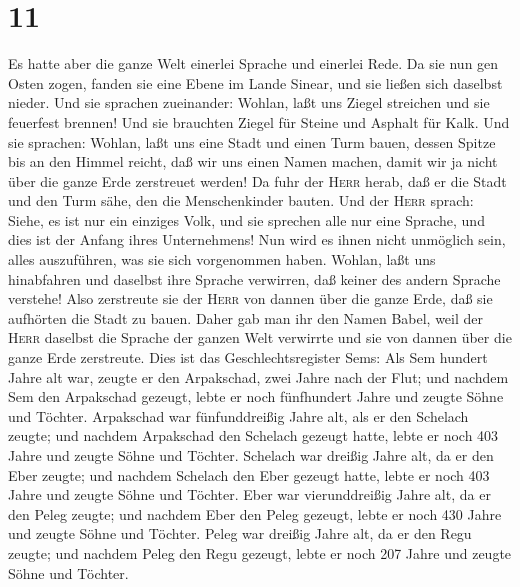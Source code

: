 \hypertarget{section-10}{%
\section{11}\label{section-10}}

 Es hatte aber die ganze Welt einerlei Sprache und
einerlei Rede.  Da sie nun gen Osten zogen, fanden sie
eine Ebene im Lande Sinear, und sie ließen sich daselbst nieder.
 Und sie sprachen zueinander: Wohlan, laßt uns Ziegel
streichen und sie feuerfest brennen! Und sie brauchten Ziegel für Steine
und Asphalt für Kalk.  Und sie sprachen: Wohlan, laßt uns
eine Stadt und einen Turm bauen, dessen Spitze bis an den Himmel reicht,
daß wir uns einen Namen machen, damit wir ja nicht über die ganze Erde
zerstreuet werden!  Da fuhr der \textsc{Herr} herab, daß
er die Stadt und den Turm sähe, den die Menschenkinder bauten.
 Und der \textsc{Herr} sprach: Siehe, es ist nur ein
einziges Volk, und sie sprechen alle nur eine Sprache, und dies ist der
Anfang ihres Unternehmens! Nun wird es ihnen nicht unmöglich sein, alles
auszuführen, was sie sich vorgenommen haben.  Wohlan, laßt
uns hinabfahren und daselbst ihre Sprache verwirren, daß keiner des
andern Sprache verstehe!  Also zerstreute sie der
\textsc{Herr} von dannen über die ganze Erde, daß sie aufhörten die
Stadt zu bauen.  Daher gab man ihr den Namen Babel, weil
der \textsc{Herr} daselbst die Sprache der ganzen Welt verwirrte und sie
von dannen über die ganze Erde zerstreute.  Dies ist das
Geschlechtsregister Sems: Als Sem hundert Jahre alt war, zeugte er den
Arpakschad, zwei Jahre nach der Flut;  und nachdem Sem
den Arpakschad gezeugt, lebte er noch fünfhundert Jahre und zeugte Söhne
und Töchter.  Arpakschad war fünfunddreißig Jahre alt,
als er den Schelach zeugte;  und nachdem Arpakschad den
Schelach gezeugt hatte, lebte er noch 403 Jahre und zeugte Söhne und
Töchter.  Schelach war dreißig Jahre alt, da er den Eber
zeugte;  und nachdem Schelach den Eber gezeugt hatte,
lebte er noch 403 Jahre und zeugte Söhne und Töchter. 
Eber war vierunddreißig Jahre alt, da er den Peleg zeugte;
 und nachdem Eber den Peleg gezeugt, lebte er noch 430
Jahre und zeugte Söhne und Töchter.  Peleg war dreißig
Jahre alt, da er den Regu zeugte;  und nachdem Peleg den
Regu gezeugt, lebte er noch 207 Jahre und zeugte Söhne und Töchter.
